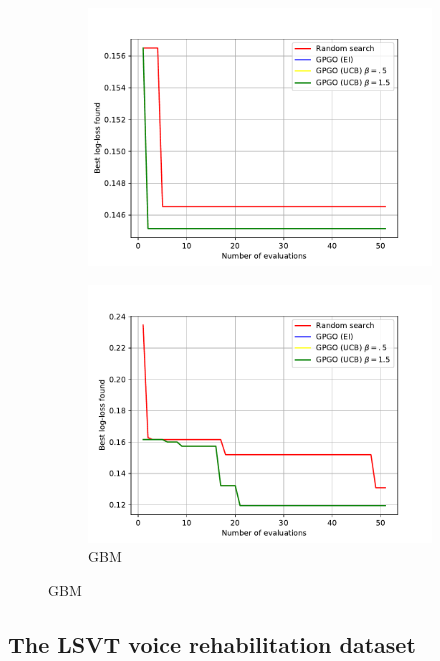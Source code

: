 \documentclass[10pt,a4paper,twoside]{book}
\begin{document}
\begin{figure}[ht]
\begin{subfigure}[t]{0.5\textwidth}
    \centering\includegraphics[width=\textwidth]{figures/chapter4/breast/mlp}
  \end{subfigure}%
    \begin{subfigure}[t]{0.5\textwidth}
    \caption{GBM}
    \centering\includegraphics[width=\textwidth]{figures/chapter4/breast/gbm}
  \end{subfigure}
  \label{fig:breastcancer}
\end{figure}

\subsection{The LSVT voice rehabilitation dataset}
\end{document}

